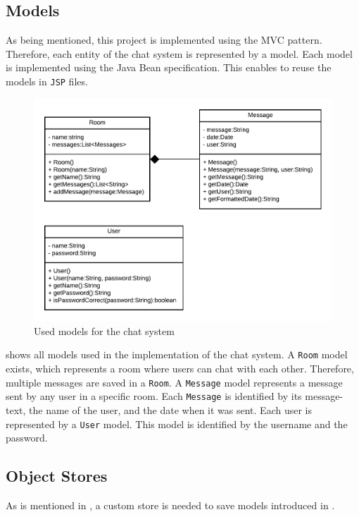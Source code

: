 \subsection{Models}\label{subsec:03_impl_models}
As being mentioned, this project is implemented using the MVC pattern. Therefore, each entity of the chat system is represented by a model.
Each model is implemented using the Java Bean specification. This enables to reuse the models in \texttt{JSP} files.
\begin{figure}[h]
\centering
\includegraphics[scale=0.8]{images/03_impl/models}
\caption{Used models for the chat system}
\label{fig:03_impl_models_models}
\end{figure}
 shows all models used in the implementation of the chat system.
A \texttt{Room} model exists, which represents a room where users can chat with each other. Therefore, multiple messages are saved in a \texttt{Room}. A \texttt{Message} model represents a message sent by any user in a specific room. Each \texttt{Message} is identified by its message-text, the name of the user, and the date when it was sent.
Each user is represented by a \texttt{User} model. This model is identified by the username and the password.


\subsection{Object Stores}\label{subsec:03_impl_objstores}
As is mentioned in , a custom store is needed to save models introduced in .

